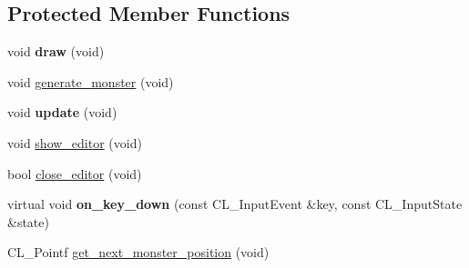 \subsection*{Protected Member Functions}
\begin{DoxyCompactItemize}
\item 
\hypertarget{classMonsterGeneratorDemo_a6f66d4ed6f4d0a4ba96f96edac2fedb1}{
void {\bfseries draw} (void)}
\label{classMonsterGeneratorDemo_a6f66d4ed6f4d0a4ba96f96edac2fedb1}

\item 
void \hyperlink{classMonsterGeneratorDemo_a9f7a998bfd08409c3db44c755d50721f}{generate\_\-monster} (void)
\item 
\hypertarget{classMonsterGeneratorDemo_ae1ad1c6c81b5e1c18ebccaa5b661e360}{
void {\bfseries update} (void)}
\label{classMonsterGeneratorDemo_ae1ad1c6c81b5e1c18ebccaa5b661e360}

\item 
void \hyperlink{classMonsterGeneratorDemo_a79a6136789c43d0a1502b7ad0381079a}{show\_\-editor} (void)
\item 
bool \hyperlink{classMonsterGeneratorDemo_a81a9869082eb20376f4a53723d805bfa}{close\_\-editor} (void)
\item 
\hypertarget{classMonsterGeneratorDemo_a2cf5ccbf2f89c759875428998fa1bf5b}{
virtual void {\bfseries on\_\-key\_\-down} (const CL\_\-InputEvent \&key, const CL\_\-InputState \&state)}
\label{classMonsterGeneratorDemo_a2cf5ccbf2f89c759875428998fa1bf5b}

\item 
CL\_\-Pointf \hyperlink{classMonsterGeneratorDemo_a82938578e271b99cb300c6a668dff550}{get\_\-next\_\-monster\_\-position} (void)
\end{DoxyCompactItemize}
